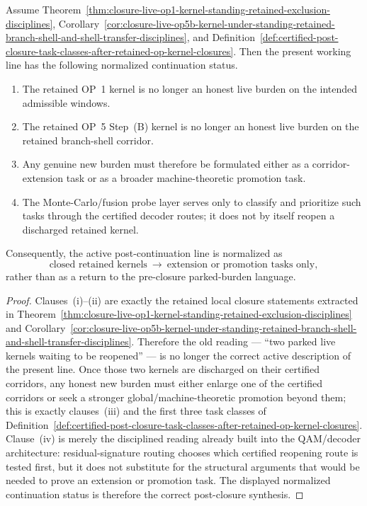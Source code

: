 \begin{proposition}
\label{prop:after-retained-kernel-closures-active-continuation-line-consists-only-of-extension-or-promotion-tasks}
Assume Theorem~\ref{thm:closure-live-op1-kernel-standing-retained-exclusion-disciplines}, Corollary~\ref{cor:closure-live-op5b-kernel-under-standing-retained-branch-shell-and-shell-transfer-disciplines}, and Definition~\ref{def:certified-post-closure-task-classes-after-retained-op-kernel-closures}. Then the present working line has the following normalized continuation status.
\begin{enumerate}[leftmargin=2em,label=(\roman*)]
 \item The retained OP~1 kernel is no longer an honest live burden on the intended admissible windows.
 \item The retained OP~5 Step~(B) kernel is no longer an honest live burden on the retained branch-shell corridor.
 \item Any genuine new burden must therefore be formulated either as a corridor-extension task or as a broader machine-theoretic promotion task.
 \item The Monte-Carlo/fusion probe layer serves only to classify and prioritize such tasks through the certified decoder routes; it does not by itself reopen a discharged retained kernel.
\end{enumerate}
Consequently, the active post-continuation line is normalized as
\[
\text{closed retained kernels}
\ \to\ 
\text{extension or promotion tasks only},
\]
rather than as a return to the pre-closure parked-burden language.
\end{proposition}

\begin{proof}
Clauses~(i)--(ii) are exactly the retained local closure statements extracted in Theorem~\ref{thm:closure-live-op1-kernel-standing-retained-exclusion-disciplines} and Corollary~\ref{cor:closure-live-op5b-kernel-under-standing-retained-branch-shell-and-shell-transfer-disciplines}. Therefore the old reading --- ``two parked live kernels waiting to be reopened'' --- is no longer the correct active description of the present line. Once those two kernels are discharged on their certified corridors, any honest new burden must either enlarge one of the certified corridors or seek a stronger global/machine-theoretic promotion beyond them; this is exactly clauses~(iii) and the first three task classes of Definition~\ref{def:certified-post-closure-task-classes-after-retained-op-kernel-closures}. Clause~(iv) is merely the disciplined reading already built into the QAM/decoder architecture: residual-signature routing chooses which certified reopening route is tested first, but it does not substitute for the structural arguments that would be needed to prove an extension or promotion task. The displayed normalized continuation status is therefore the correct post-closure synthesis.
\end{proof}

